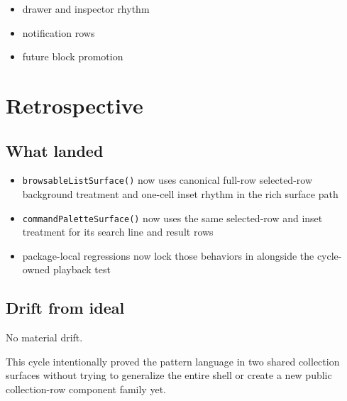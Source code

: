 \begin{itemize}
\tightlist
\item
  drawer and inspector rhythm
\item
  notification rows
\item
  future block promotion
\end{itemize}

\section{Retrospective}\label{record-170-retrospective}

\subsection{What landed}\label{record-170-what-landed}

\begin{itemize}
\tightlist
\item
  \texttt{b\allowbreak{}r\allowbreak{}o\allowbreak{}w\allowbreak{}s\allowbreak{}a\allowbreak{}b\allowbreak{}l\allowbreak{}e\allowbreak{}L\allowbreak{}i\allowbreak{}s\allowbreak{}t\allowbreak{}S\allowbreak{}u\allowbreak{}r\allowbreak{}f\allowbreak{}a\allowbreak{}c\allowbreak{}e\allowbreak{}(\allowbreak{})} now uses canonical full-row selected-row background treatment and one-cell inset rhythm in the rich surface path
\item
  \texttt{c\allowbreak{}o\allowbreak{}m\allowbreak{}m\allowbreak{}a\allowbreak{}n\allowbreak{}d\allowbreak{}P\allowbreak{}a\allowbreak{}l\allowbreak{}e\allowbreak{}t\allowbreak{}t\allowbreak{}e\allowbreak{}S\allowbreak{}u\allowbreak{}r\allowbreak{}f\allowbreak{}a\allowbreak{}c\allowbreak{}e\allowbreak{}(\allowbreak{})} now uses the same selected-row and inset treatment for its search line and result rows
\item
  package-local regressions now lock those behaviors in alongside the cycle-owned playback test
\end{itemize}

\subsection{Drift from ideal}\label{record-170-drift-from-ideal}

No material drift.

This cycle intentionally proved the pattern language in two shared collection surfaces without trying to generalize the entire shell or create a new public collection-row component family yet.

